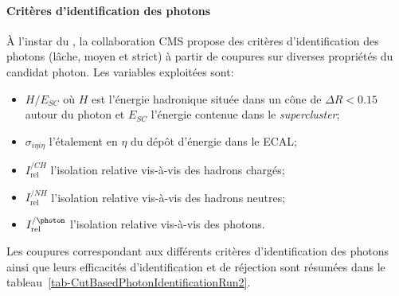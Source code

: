 \paragraph{Critères d'identification des photons}
À l'instar du \CutBasedEleID,
la collaboration CMS propose des critères d'identification des photons (lâche, moyen et strict) à partir de coupures sur diverses propriétés du \og candidat \fg{} photon.
Les variables exploitées sont:
\begin{itemize}
\item $H/E_{SC}$ où $H$ est l'énergie hadronique située dans un cône de $\Delta R < \num{0.15}$ autour du photon et $E_{SC}$ l'énergie contenue dans le \emph{supercluster};
\item $\sigma_{i\eta i\eta}$ l'étalement en $\eta$ du dépôt d'énergie dans le ECAL;
\item $I^{/CH}_\text{rel}$ l'isolation relative vis-à-vis des hadrons chargés;
\item $I^{/NH}_\text{rel}$ l'isolation relative vis-à-vis des hadrons neutres;
\item $I^{/\photon}_\text{rel}$ l'isolation relative vis-à-vis des photons.
\end{itemize}
Les coupures correspondant aux différents critères d'identification des photons ainsi que leurs efficacités d'identification et de réjection sont résumées dans le tableau~\ref{tab-CutBasedPhotonIdentificationRun2}.
